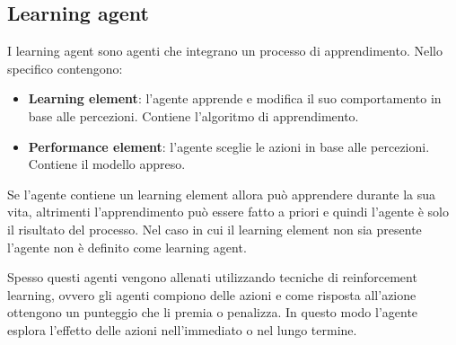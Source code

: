 \subsection{Learning agent}
I learning agent sono agenti che integrano un processo di apprendimento. Nello
specifico contengono:
\begin{itemize}
    \item \textbf{Learning element}: l'agente apprende e modifica il suo comportamento
          in base alle percezioni. Contiene l'algoritmo di apprendimento.
    \item \textbf{Performance element}: l'agente sceglie le azioni in base alle
          percezioni. Contiene il modello appreso.
\end{itemize}

Se l'agente contiene un learning element allora può apprendere durante la sua vita,
altrimenti l'apprendimento può essere fatto a priori e quindi l'agente è solo il
risultato del processo. Nel caso in cui il learning element non sia presente
l'agente non è definito come learning agent.

Spesso questi agenti vengono allenati utilizzando tecniche di reinforcement
learning, ovvero gli agenti compiono delle azioni e come risposta all'azione
ottengono un punteggio che li premia o penalizza. In questo modo l'agente esplora
l'effetto delle azioni nell'immediato o nel lungo termine.